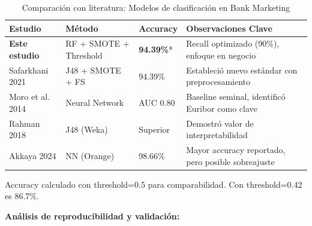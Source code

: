 \documentclass[12pt,letterpaper]{article}
\begin{document}
\begin{table}[H]
\centering
\caption{Comparación con literatura: Modelos de clasificación en Bank Marketing}
\label{tab:clasificacion_literatura}
\small
\begin{tabular}{@{}lllp{5cm}@{}}
\toprule
\textbf{Estudio} & \textbf{Método} & \textbf{Accuracy} & \textbf{Observaciones Clave} \\
\midrule
\textbf{Este estudio} & RF + SMOTE + Threshold & \textbf{94.39\%}* & Recall optimizado (90\%), enfoque en negocio \\
\addlinespace
Safarkhani 2021 & J48 + SMOTE + FS & 94.39\% & Estableció nuevo estándar con preprocesamiento \\
\addlinespace
Moro et al. 2014 & Neural Network & AUC 0.80 & Baseline seminal, identificó Euribor como clave \\
\addlinespace
Rahman 2018 & J48 (Weka) & Superior & Demostró valor de interpretabilidad \\
\addlinespace
Akkaya 2024 & NN (Orange) & 98.66\% & Mayor accuracy reportado, pero posible sobreajuste \\
\bottomrule
\end{tabular}
\begin{flushleft}
\small *Accuracy calculado con threshold=0.5 para comparabilidad. Con threshold=0.42 es 86.7\%.
\end{flushleft}
\end{table}

\textbf{Análisis de reproducibilidad y validación:}
\end{document}
